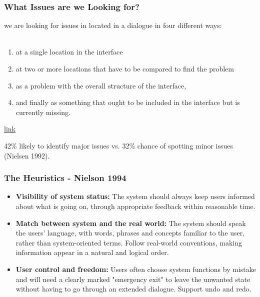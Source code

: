 \begin{frame}
	\frametitle{What Issues are we Looking for?}
	we are looking for issues in located in a dialogue in four different ways: \\~\\
	
	\begin{enumerate}
		\item at a single location in the interface 
		\item at two or more locations that have to be compared to find the problem
		\item as a problem with the overall structure of the interface, 
		\item and finally as something that ought to be included in the interface but is currently missing. 
	\end{enumerate}
	\href{https://www.nngroup.com/articles/usability-problems-found-by-heuristic-evaluation/}{\tiny{link}}
	
	42\% likely to identify major issues vs. 32\% chance of spotting minor issues (Nielsen 1992).
		
\end{frame}




\begin{frame}
	\frametitle{The Heuristics - Nielson 1994}
		
	\begin{itemize}
		\item \textbf{Visibility of system status:} The system should always keep users informed about what is going on, through appropriate feedback within reasonable time.
		\item \textbf{Match between system and the real world:} The system should speak the users' language, with words, phrases and concepts familiar to the user, rather than system-oriented terms. Follow real-world conventions, making information appear in a natural and logical order.
		\item \textbf{User control and freedom:} Users often choose system functions by mistake and will need a clearly marked "emergency exit" to leave the unwanted state without having to go through an extended dialogue. Support undo and redo.
	\end{itemize}
\end{frame}	
		
